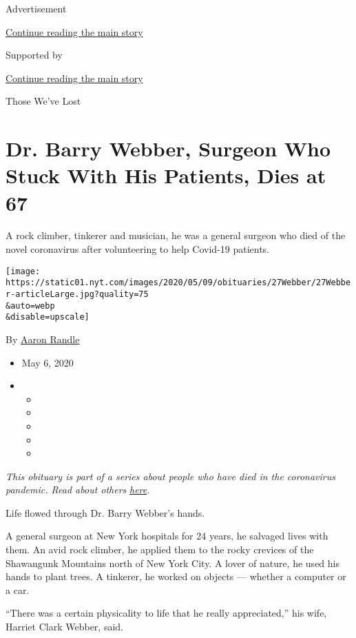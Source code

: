 Advertisement

\protect\hyperlink{after-top}{Continue reading the main story}

Supported by

\protect\hyperlink{after-sponsor}{Continue reading the main story}

Those We've Lost

\hypertarget{dr-barry-webber-surgeon-who-stuck-with-his-patients-dies-at-67}{%
\section{Dr. Barry Webber, Surgeon Who Stuck With His Patients, Dies at
67}\label{dr-barry-webber-surgeon-who-stuck-with-his-patients-dies-at-67}}

A rock climber, tinkerer and musician, he was a general surgeon who died
of the novel coronavirus after volunteering to help Covid-19 patients.

\texttt{[image: https://static01.nyt.com/images/2020/05/09/obituaries/27Webber/27Webber-articleLarge.jpg?quality=75\\\&auto=webp\\\&disable=upscale]}

By \href{https://www.nytimes.com/by/aaron-randle}{Aaron Randle}

\begin{itemize}
\item
  May 6, 2020
\item
  \begin{itemize}
  \item
  \item
  \item
  \item
  \item
  \end{itemize}
\end{itemize}

\emph{This obituary is part of a series about people who have died in
the coronavirus pandemic. Read about others}
\href{https://www.nytimes.com/series/people-who-have-died-of-the-coronavirus}{\emph{here}}\emph{.}

Life flowed through Dr. Barry Webber's hands.

A general surgeon at New York hospitals for 24 years, he salvaged lives
with them. An avid rock climber, he applied them to the rocky crevices
of the Shawangunk Mountains north of New York City. A lover of nature,
he used his hands to plant trees. A tinkerer, he worked on objects ---
whether a computer or a car.

``There was a certain physicality to life that he really appreciated,''
his wife, Harriet Clark Webber, said.

